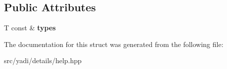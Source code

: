 \subsection*{Public Attributes}
\begin{DoxyCompactItemize}
\item 
\mbox{\label{structyadi_1_1details_1_1yadi__help__fetcher_1_1model_a97e1055826d47be6fff465c2be501173}} 
T const  \& {\bfseries types}
\end{DoxyCompactItemize}


The documentation for this struct was generated from the following file\+:\begin{DoxyCompactItemize}
\item 
src/yadi/details/help.\+hpp\end{DoxyCompactItemize}
